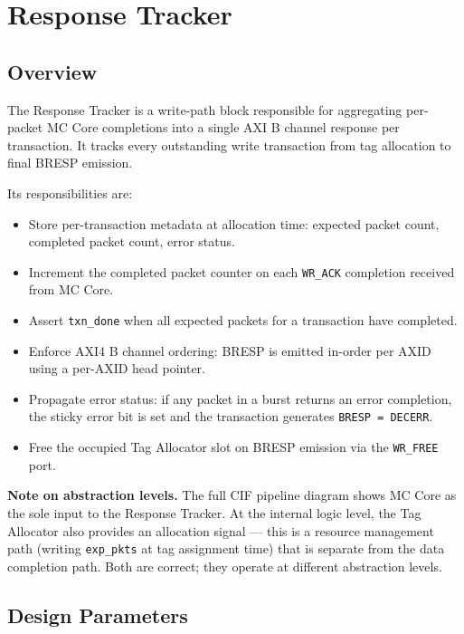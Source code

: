 \section{Response Tracker}
\subsection{Overview}

The Response Tracker is a write-path block responsible for aggregating
per-packet MC Core completions into a single AXI B channel response per
transaction. It tracks every outstanding write transaction from tag
allocation to final BRESP emission.

Its responsibilities are:
\begin{itemize}
  \item Store per-transaction metadata at allocation time: expected
        packet count, completed packet count, error status.
  \item Increment the completed packet counter on each \texttt{WR\_ACK}
        completion received from MC Core.
  \item Assert \texttt{txn\_done} when all expected packets for a
        transaction have completed.
  \item Enforce AXI4 B channel ordering: BRESP is emitted in-order per
        AXID using a per-AXID head pointer.
  \item Propagate error status: if any packet in a burst returns an
        error completion, the sticky error bit is set and the
        transaction generates \texttt{BRESP = DECERR}.
  \item Free the occupied Tag Allocator slot on BRESP emission via the
        \texttt{WR\_FREE} port.
\end{itemize}

\textbf{Note on abstraction levels.} The full CIF pipeline diagram
shows MC Core as the sole input to the Response Tracker. At the
internal logic level, the Tag Allocator also provides an allocation
signal — this is a resource management path (writing \texttt{exp\_pkts}
at tag assignment time) that is separate from the data completion path.
Both are correct; they operate at different abstraction levels.

\subsection{Design Parameters}

